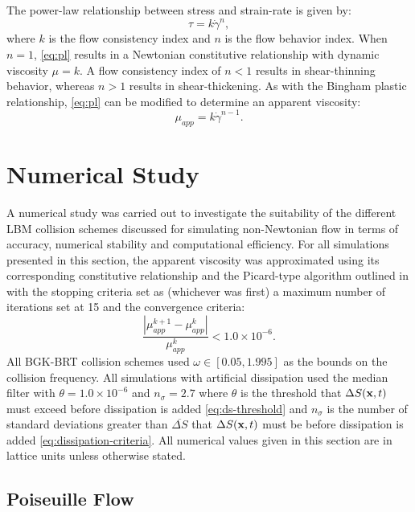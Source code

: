 The power-law relationship between stress and strain-rate is given by:
\begin{equation} \label{eq:pl}
\tau = k \dot{\gamma}^n,
\end{equation}
\noindent where $k$ is the flow consistency index and $n$ is the flow behavior index.
When $n = 1$, \eqref{eq:pl} results in a Newtonian constitutive relationship with dynamic viscosity $\mu = k$.
A flow consistency index of $n < 1$ results in shear-thinning behavior, whereas $n > 1$ results in shear-thickening.
As with the Bingham plastic relationship, \eqref{eq:pl} can be modified to determine an apparent viscosity:
\begin{equation} \label{eq:pl-mu-app}
\mu_{app} = k \dot{\gamma}^{n-1}.
\end{equation}

\section{Numerical Study} \label{sec:numerical-study}

A numerical study was carried out to investigate the suitability of the different LBM collision schemes discussed for simulating non-Newtonian flow in terms of accuracy, numerical stability and computational efficiency.
For all simulations presented in this section, the apparent viscosity was approximated using its corresponding constitutive relationship and the Picard-type algorithm outlined in  with the stopping criteria set as (whichever was first) a maximum number of iterations set at 15 and the convergence criteria:
\begin{equation} \label{eq:mu-app-conv}
\frac{\left|\mu_{app}^{k+1} - \mu_{app}^{k}\right|}{\mu_{app}^{k}} < 1.0 \times 10^{-6}.
\end{equation}
All BGK-BRT collision schemes used $\omega \in [0.05, 1.995]$ as the bounds on the collision frequency.
All simulations with artificial dissipation used the median filter with $\theta = 1.0 \times 10^{-6}$ and $n_{\sigma} = 2.7$ where $\theta$ is the threshold that $\Delta S(\mathbf{x}, t)$ must exceed before dissipation is added \eqref{eq:ds-threshold} and $n_{\sigma}$ is the number of standard deviations greater than $\overline{\Delta S}$ that $\Delta S(\mathbf{x}, t)$ must be before dissipation is added \eqref{eq:dissipation-criteria}.
All numerical values given in this section are in lattice units unless otherwise stated.

\subsection{Poiseuille Flow}

